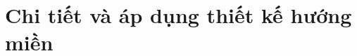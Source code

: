 \documentclass[oneside]{report} %
\begin{document}









\chapter{Chi tiết và áp dụng thiết kế hướng miền}


% 

% 

\end{document}
